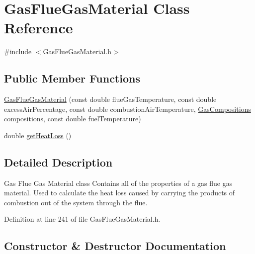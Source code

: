 \hypertarget{class_gas_flue_gas_material}{}\section{Gas\+Flue\+Gas\+Material Class Reference}
\label{class_gas_flue_gas_material}


{\ttfamily \#include $<$Gas\+Flue\+Gas\+Material.\+h$>$}

\subsection*{Public Member Functions}
\begin{DoxyCompactItemize}
\item 
\hyperlink{class_gas_flue_gas_material_aca4ce48fe0feea4e6032679652f38c98}{Gas\+Flue\+Gas\+Material} (const double flue\+Gas\+Temperature, const double excess\+Air\+Percentage, const double combustion\+Air\+Temperature, \hyperlink{class_gas_compositions}{Gas\+Compositions} compositions, const double fuel\+Temperature)
\item 
double \hyperlink{class_gas_flue_gas_material_ad9990d400536c6e8c7c53b9212de400b}{get\+Heat\+Loss} ()
\end{DoxyCompactItemize}


\subsection{Detailed Description}
Gas Flue Gas Material class Contains all of the properties of a gas flue gas material. Used to calculate the heat loss caused by carrying the products of combustion out of the system through the flue. 

Definition at line 241 of file Gas\+Flue\+Gas\+Material.\+h.



\subsection{Constructor \& Destructor Documentation}
\mbox{\label{class_gas_flue_gas_material_aca4ce48fe0feea4e6032679652f38c98}} 
